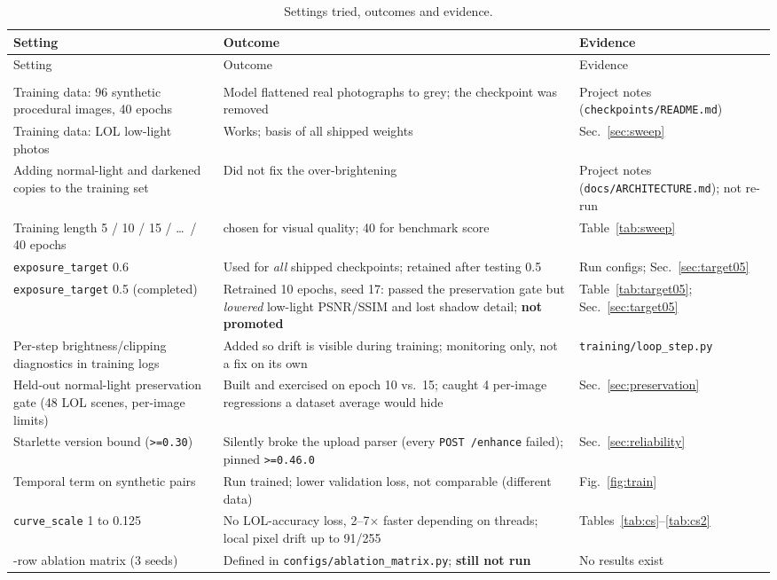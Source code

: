 \documentclass{article}
\newcommand{\code}[1]{\texttt{#1}}
\begin{document}
\begingroup
\footnotesize
\setlength{\tabcolsep}{4pt}
\begin{longtable}{@{}>{\raggedright\arraybackslash}p{.22\linewidth}>{\raggedright\arraybackslash}p{.43\linewidth}>{\raggedright\arraybackslash}p{.31\linewidth}@{}}
\caption{Settings tried, outcomes and evidence.}\label{tab:tried}\\
\toprule
Setting & Outcome & Evidence\\
\midrule
\endfirsthead
\toprule
Setting & Outcome & Evidence\\
\midrule
\endhead
\midrule
\multicolumn{3}{r}{\small Continued on the next page}\\
\endfoot
\bottomrule
\endlastfoot
Training data: 96 synthetic procedural images, 40 epochs & Model flattened real photographs to grey; the checkpoint was removed & Project notes (\code{checkpoints/README.md})\\
Training data: LOL low-light photos & Works; basis of all shipped weights & Sec.~\ref{sec:sweep}\\
Adding normal-light and darkened copies to the training set & Did not fix the over-brightening & Project notes (\code{docs/ARCHITECTURE.md}); not re-run\\
Training length 5 / 10 / 15 / \dots\ / 40 epochs & 10 chosen for visual quality; 40 for benchmark score & Table~\ref{tab:sweep}\\
\code{exposure\_target} 0.6 & Used for \emph{all} shipped checkpoints; retained after testing 0.5 & Run configs; Sec.~\ref{sec:target05}\\
\code{exposure\_target} 0.5 (completed) & Retrained 10 epochs, seed 17: passed the preservation gate but \emph{lowered} low-light PSNR/SSIM and lost shadow detail; \textbf{not promoted} & Table~\ref{tab:target05}; Sec.~\ref{sec:target05}\\
Per-step brightness/clipping diagnostics in training logs & Added so drift is visible during training; monitoring only, not a fix on its own & \code{training/loop\_step.py}\\
Held-out normal-light preservation gate (48 LOL scenes, per-image limits) & Built and exercised on epoch 10 vs.\ 15; caught 4 per-image regressions a dataset average would hide & Sec.~\ref{sec:preservation}\\
Starlette version bound (\code{>=0.30}) & Silently broke the upload parser (every \code{POST /enhance} failed); pinned \code{>=0.46.0} & Sec.~\ref{sec:reliability}\\
Temporal term on synthetic pairs & Run trained; lower validation loss, not comparable (different data) & Fig.~\ref{fig:train}\\
\code{curve\_scale} 1 to 0.125 & No LOL-accuracy loss, 2--7$\times$ faster depending on threads; local pixel drift up to 91/255 & Tables~\ref{tab:cs}--\ref{tab:cs2}\\
13-row ablation matrix (3 seeds) & Defined in \code{configs/ablation\_matrix.py}; \textbf{still not run} & No results exist\\
\end{longtable}
\endgroup
\end{document}
